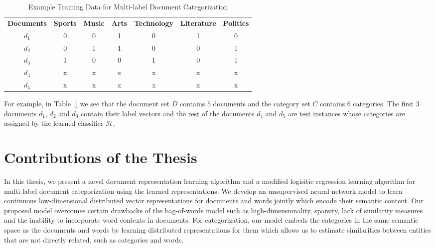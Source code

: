 \begin{table}[h!]
\tabcolsep=0.1cm
\footnotesize
\begin{center}
\begin{tabular}{c@{\hskip5mm} c c c c c c}
\toprule
\textbf{Documents}	&	\textbf{Sports} & \textbf{Music} & \textbf{Arts} & \textbf{Technology}  & \textbf{Literature} & \textbf{Politics}\\
\cmidrule{1-1}
\cmidrule{2-7}
$d_{1}$ & 0 & 0 & 1 & 0 & 1 & 0\\
$d_{2}$ & 0 & 1 & 1 & 0 & 0 & 1\\
$d_{3}$ & 1 & 0 & 0 & 1 & 0 & 1\\
$d_{4}$ & x & x & x & x & x & x\\
$d_{5}$ & x & x & x & x & x & x\\
\bottomrule         
\end{tabular}
\caption{\label{traindata:example:table}{Example Training Data for Multi-label Document Categorization}}
\end{center}
\end{table}

For example, in Table~\ref{traindata:example:table} we see that the document set $D$ contains $5$ documents and the category set $C$ contains $6$ categories. The first $3$ documents $d_{1}$, $d_{2}$ and $d_{3}$ contain their label vectors and the rest of the documents $d_{4}$ and $d_{5}$ are test instances whose categories are assigned by the learned classifier $\mathcal{H}$.

\section{Contributions of the Thesis}
In this thesis, we present a novel document representation learning algorithm and a modified logisitic regression learning algorithm for multi-label document categorization using the learned representations.
We develop an unsupervised neural network model to learn continuous 
low-dimensional distributed vector representations for documents and 
words jointly which encode their semantic content. 
Our proposed model overcomes certain drawbacks of the bag-of-words 
model such as high-dimensionality, sparsity, lack of similarity 
measures and the inability to incorporate word contexts in documents. 
For categorization, our model embeds the categories in the same semantic space as the documents and words by learning distributed representations for them which allows us to estimate similarities between entities
that are not directly related, such as categories and words.

